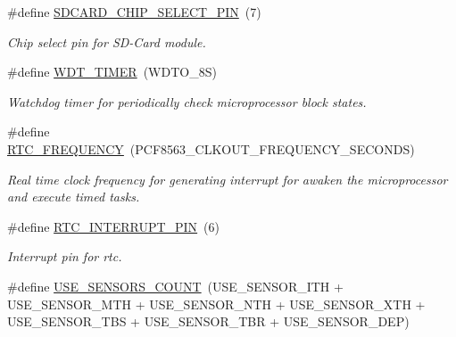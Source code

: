 \begin{DoxyCompactItemize}
\mbox{\label{rmap-config_8h_a52845a6b315de684e7eda2ffe7863b55}} 
\#define \hyperlink{rmap-config_8h_a52845a6b315de684e7eda2ffe7863b55}{S\+D\+C\+A\+R\+D\+\_\+\+C\+H\+I\+P\+\_\+\+S\+E\+L\+E\+C\+T\+\_\+\+P\+IN}~(7)
\begin{DoxyCompactList}\small\item\em Chip select pin for S\+D-\/\+Card module. \end{DoxyCompactList}\item 
\#define \hyperlink{rmap-config_8h_a983c9777673ee873f12ec9f489215321}{W\+D\+T\+\_\+\+T\+I\+M\+ER}~(W\+D\+T\+O\+\_\+8S)
\begin{DoxyCompactList}\small\item\em Watchdog timer for periodically check microprocessor block states. \end{DoxyCompactList}\item 
\mbox{\label{rmap-config_8h_a6b7af814754ac70e8aa5e34aa9295df5}} 
\#define \hyperlink{rmap-config_8h_a6b7af814754ac70e8aa5e34aa9295df5}{R\+T\+C\+\_\+\+F\+R\+E\+Q\+U\+E\+N\+CY}~(P\+C\+F8563\+\_\+\+C\+L\+K\+O\+U\+T\+\_\+\+F\+R\+E\+Q\+U\+E\+N\+C\+Y\+\_\+\+S\+E\+C\+O\+N\+DS)
\begin{DoxyCompactList}\small\item\em Real time clock frequency for generating interrupt for awaken the microprocessor and execute timed tasks. \end{DoxyCompactList}\item 
\mbox{\label{rmap-config_8h_a1efb928882c9a9d83d78e499091a8319}} 
\#define \hyperlink{rmap-config_8h_a1efb928882c9a9d83d78e499091a8319}{R\+T\+C\+\_\+\+I\+N\+T\+E\+R\+R\+U\+P\+T\+\_\+\+P\+IN}~(6)
\begin{DoxyCompactList}\small\item\em Interrupt pin for rtc. \end{DoxyCompactList}\item 
\mbox{\label{rmap-config_8h_af18dc3de744722cb308451b7a705611b}} 
\#define \hyperlink{rmap-config_8h_af18dc3de744722cb308451b7a705611b}{U\+S\+E\+\_\+\+S\+E\+N\+S\+O\+R\+S\+\_\+\+C\+O\+U\+NT}~(U\+S\+E\+\_\+\+S\+E\+N\+S\+O\+R\+\_\+\+I\+TH + U\+S\+E\+\_\+\+S\+E\+N\+S\+O\+R\+\_\+\+M\+TH + U\+S\+E\+\_\+\+S\+E\+N\+S\+O\+R\+\_\+\+N\+TH + U\+S\+E\+\_\+\+S\+E\+N\+S\+O\+R\+\_\+\+X\+TH + U\+S\+E\+\_\+\+S\+E\+N\+S\+O\+R\+\_\+\+T\+BS + U\+S\+E\+\_\+\+S\+E\+N\+S\+O\+R\+\_\+\+T\+BR + U\+S\+E\+\_\+\+S\+E\+N\+S\+O\+R\+\_\+\+D\+EP)

\end{DoxyCompactItemize}
